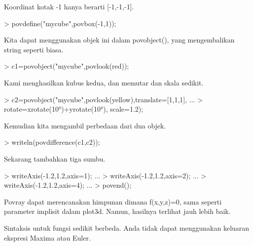 \documentclass{report}
\begin{document}
\begin{eulernotebook}
\begin{eulercomment}
\begin{eulercomment}
\begin{eulercomment}
Koordinat kotak -1 hanya berarti [-1,-1,-1].
\end{eulercomment}
\begin{eulerprompt}
> povdefine("mycube",povbox(-1,1));
\end{eulerprompt}
\begin{eulercomment}
Kita dapat menggunakan objek ini dalam povobject(), yang mengembalikan
string seperti biasa.
\end{eulercomment}
\begin{eulerprompt}
> c1=povobject("mycube",povlook(red));
\end{eulerprompt}
\begin{eulercomment}
Kami menghasilkan kubus kedua, dan memutar dan skala sedikit.
\end{eulercomment}
\begin{eulerprompt}
> c2=povobject("mycube",povlook(yellow),translate=[1,1,1], ...
>  rotate=xrotate(10°)+yrotate(10°), scale=1.2);
\end{eulerprompt}
\begin{eulercomment}
Kemudian kita mengambil perbedaan dari dua objek.
\end{eulercomment}
\begin{eulerprompt}
> writeln(povdifference(c1,c2));
\end{eulerprompt}
\begin{eulercomment}
Sekarang tambahkan tiga sumbu.
\end{eulercomment}
\begin{eulerprompt}
> writeAxis(-1.2,1.2,axis=1); ...
> writeAxis(-1.2,1.2,axis=2); ...
> writeAxis(-1.2,1.2,axis=4); ...
> povend();
\end{eulerprompt}
\begin{eulercomment}
Povray dapat merencanakan himpunan dimana f(x,y,z)=0, sama seperti
parameter implisit dalam plot3d. Namun, hasilnya terlihat jauh lebih
baik.

Sintaksis untuk fungsi sedikit berbeda. Anda tidak dapat menggunakan
keluaran ekspresi Maxima atau Euler.


\end{eulercomment}
\end{eulercomment}
\end{eulercomment}
\end{eulernotebook}
\end{document}
